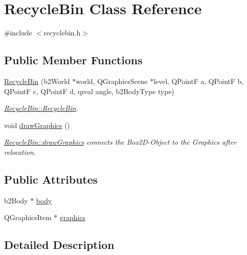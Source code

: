 \hypertarget{class_recycle_bin}{}\section{Recycle\+Bin Class Reference}
\label{class_recycle_bin}


{\ttfamily \#include $<$recyclebin.\+h$>$}

\subsection*{Public Member Functions}
\begin{DoxyCompactItemize}
\item 
\hyperlink{class_recycle_bin_aff0bd5474a5d05939b234d1d951e86e8}{Recycle\+Bin} (b2\+World $\ast$world, Q\+Graphics\+Scene $\ast$level, Q\+PointF a, Q\+PointF b, Q\+PointF c, Q\+PointF d, qreal angle, b2\+Body\+Type type)
\begin{DoxyCompactList}\small\item\em \hyperlink{class_recycle_bin_aff0bd5474a5d05939b234d1d951e86e8}{Recycle\+Bin\+::\+Recycle\+Bin}. \end{DoxyCompactList}\item 
void \hyperlink{class_recycle_bin_ab8158c4e18c16fb3e55638a60327d978}{draw\+Graphics} ()
\begin{DoxyCompactList}\small\item\em \hyperlink{class_recycle_bin_ab8158c4e18c16fb3e55638a60327d978}{Recycle\+Bin\+::draw\+Graphics} connects the Box2\+D-\/\+Object to the Graphics after relocation. \end{DoxyCompactList}\end{DoxyCompactItemize}
\subsection*{Public Attributes}
\begin{DoxyCompactItemize}
\item 
b2\+Body $\ast$ \hyperlink{class_recycle_bin_a1e0b25e04920ce7dc737549928d1f45a}{body}
\item 
Q\+Graphics\+Item $\ast$ \hyperlink{class_recycle_bin_a876a38f5ba7524bd618c1c3749bb7a83}{graphics}
\end{DoxyCompactItemize}


\subsection{Detailed Description}


